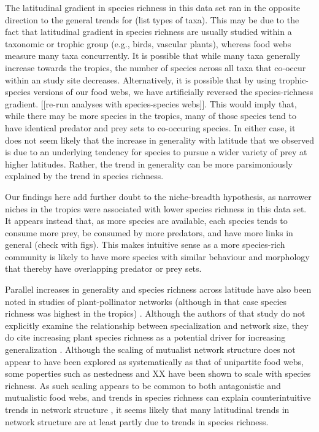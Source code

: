 \documentclass[12pt]{article}
\begin{document}
The latitudinal gradient in species richness in this data set ran in the opposite 
direction to the general trends for (list types of taxa). This may be due to the 
fact that latitudinal gradient in species richness are usually studied within a
taxonomic or trophic group (e.g., birds, vascular plants), whereas food webs 
measure many taxa concurrently. It is possible that while many taxa generally increase
towards the tropics, the number of species across all taxa that co-occur within an 
study site decreases. Alternatively, it is possible that by using trophic-species versions
of our food webs, we have artificially reversed the species-richness gradient. [[re-run analyses
with species-species webs]]. This would imply that, while there may be more species in the tropics,
many of those species tend to have identical predator and prey sets to co-occuring species. In either
case, it does not seem likely that the increase in
generality with latitude that we observed is due to an underlying tendency for
species to pursue a wider variety of prey at higher latitudes. Rather, the
trend in generality can be more parsimoniously explained by the trend in
species richness.


Our findings here add further doubt to the niche-breadth hypothesis, as
narrower niches in the tropics were associated with lower species richness in
this data set. It appears instead that, as more species are available, each
species tends to consume more prey, be consumed by more predators, and have
more links in general (check with figs). This makes intuitive sense as a more
species-rich community is likely to have more species with similar behaviour
and morphology that thereby have overlapping predator or prey sets.


Parallel increases in generality and species richness across latitude have
also been noted in studies of plant-pollinator networks (although in that case
species richness was highest in the tropics) \citep{Schleuning2012}. Although
the authors of that study do not explicitly examine the relationship between
specialization and network size, they do cite increasing plant species
richness as a potential driver for increasing generalization
\citep{Schleuning2012}. Although the scaling of mutualist network structure
does not appear to have been explored as systematically as that of unipartite
food webs, some poperties such as nestedness \citep{Vazquez2004} and XX
\citep{} have been shown to scale with species richness. As such scaling
appears to be common to both antagonistic and mutualistic food webs, and
trends in species richness can explain counterintuitive trends in network
structure \citep{Schleuning2012}, it seems likely that many latitudinal trends
in network structure are at least partly due to trends in species richness.
\end{document}
